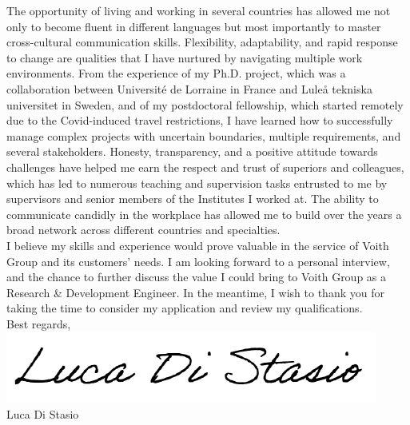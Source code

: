 \documentclass[
  a4paper, 
]{fortysecondscv}
\def\position{Research \& Development Engineer}
\def\company{Voith Group}
\begin{document}
The opportunity of living and working in several countries has allowed me not only to become fluent in different languages but most importantly to master cross-cultural communication skills. Flexibility, adaptability, and rapid response to change are qualities that I have nurtured by navigating multiple work environments. From the experience of my Ph.D. project, which was a collaboration between Universit{\'e} de Lorraine in France and Lule{\aa} tekniska universitet in Sweden, and of my postdoctoral fellowship, which started remotely due to the Covid-induced travel restrictions, I have learned how to successfully manage complex projects with uncertain boundaries, multiple requirements, and several stakeholders. Honesty, transparency, and a positive attitude towards challenges have helped me earn the respect and trust of superiors and colleagues, which has led to numerous teaching and supervision tasks entrusted to me by supervisors and senior members of the Institutes I worked at. The ability to communicate candidly in the workplace has allowed me to build over the years a broad network across different countries and specialties.\\[8pt]
I believe my skills and experience would prove valuable in the service of {\company} and its customers' needs. I am looking forward to a personal interview, and the chance to further discuss the value I could bring to {\company} as a \position. In the meantime, I wish to thank you for taking the time to consider my application and review my
qualifications.\\[12pt]
Best regards,\\
\includegraphics[scale=0.75]{Signature.png}\\
Luca Di Stasio
\end{document}
